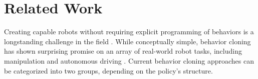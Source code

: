 
\section{Related Work}
Creating capable robots without requiring explicit programming of behaviors is a longstanding challenge in the field \cite{atkeson1997robot, argall2009survey, ravichandar2020recent}.
While conceptually simple, behavior cloning has shown surprising promise on an array of real-world robot tasks, including manipulation \cite{zhang2018deep, florence2019self, mandlekar2020learning, mandlekar2020iris, zeng2021transporter, rahmatizadeh2018vision, avigal2022speedfolding} and autonomous driving \cite{pomerleau1988alvinn, bojarski2016end}. Current behavior cloning approaches can be categorized into two groups, depending on the policy's structure.


